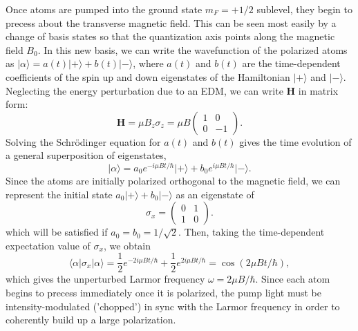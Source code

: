 \documentclass [10pt, twoside] {uwthesis}[2012/04/02]
\begin{document}
Once atoms are pumped into the ground state $m_F=+1/2$ sublevel, they begin to precess about the transverse magnetic field. This can be seen most easily by a change of basis states so that the quantization axis points along the magnetic field $B_0$. In this new basis, we can write the wavefunction of the polarized atoms as $\vert\alpha\rangle = a(t)\vert+\rangle + b(t)\vert-\rangle$, where $a(t)$ and $b(t)$ are the time-dependent coefficients of the spin up and down eigenstates of the Hamiltonian $\vert+\rangle$ and $\vert-\rangle$. Neglecting the energy perturbation due to an EDM, we can write $\mathbf{H}$ in matrix form:
 \[ \mathbf{H} = \mu B_z \sigma_z = \mu B \begin{pmatrix} 1 & 0 \\ 0 & -1 \end{pmatrix} .\]
Solving the Schr\"{o}dinger equation for $a(t)$ and $b(t)$ gives the time evolution of a general superposition of eigenstates, 
\[\vert\alpha\rangle = a_0 e^{-i \mu B t /\hbar}\vert+\rangle + b_0 e^{i \mu B t /\hbar}\vert-\rangle.\]  
Since the atoms are initially polarized orthogonal to the magnetic field, we can represent the initial state $a_0\vert+\rangle + b_0\vert-\rangle$ as an eigenstate of 
\[\sigma_x =  \begin{pmatrix} 0 & 1 \\ 1 & 0 \end{pmatrix} .\]
which will be satisfied if $a_0 = b_0 = 1/\sqrt{2}$. Then, taking the time-dependent expectation value of $\sigma_x$, we obtain \[\langle\alpha\vert \sigma_x \vert\alpha\rangle = \dfrac{1}{2} e^{-2 i \mu B t /\hbar}  + \dfrac{1}{2} e^{2 i \mu B t /\hbar} = \cos(2 \mu B t /\hbar),\]
which gives the unperturbed Larmor frequency $\omega = 2 \mu B/\hbar.$ Since each atom begins to precess immediately once it is polarized, the pump light must be intensity-modulated ('chopped') in sync with the Larmor frequency in order to coherently build up a large polarization.
\end{document}
